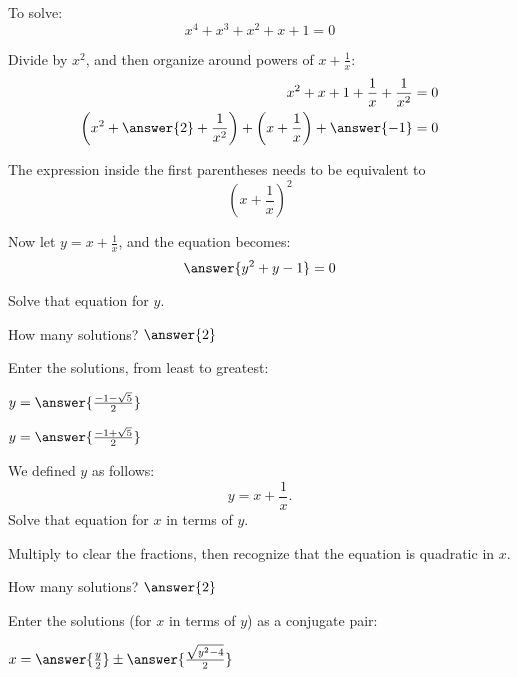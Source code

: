 \documentclass[space,nooutcomes]{ximera}
\begin{document}
\begin{problem}

To solve: 
\[
x^4+x^3+x^2+x+1=0
\]

Divide by $x^2$, and then organize around powers of $x + \frac{1}{x}$: 
\begin{align*}
x^2+x+1+\frac{1}{x}+\frac{1}{x^2}&=0 \\
\left(x^2+ \answer{2} + \frac{1}{x^2}\right)+ \left(x+\frac{1}{x}\right)+\answer{-1}&=0 \\
\end{align*}
\begin{hint}
The expression inside the first parentheses needs to be equivalent to 
\[
\left(x+\frac{1}{x}\right)^2
\]
\end{hint}
\begin{problem}
Now let $y = x + \frac{1}{x}$, and the equation becomes: 
\[
\answer{y^2+y-1}=0
\]

Solve that equation for $y$.

How many solutions?  $\answer{2}$ 

\begin{problem}
Enter the solutions, from least to greatest: 

\begin{prompt}
$y = \answer{\frac{-1-\sqrt{5}}{2}}$

$y = \answer{\frac{-1+\sqrt{5}}{2}}$
\end{prompt}

\end{problem}
\end{problem}
\end{problem}

\begin{problem}
We defined $y$ as follows: 
\[
y = x + \frac{1}{x}.  
\]
Solve that equation for $x$ in terms of $y$.  
\begin{hint}
Multiply to clear the fractions, then recognize that the equation is quadratic in $x$.  
\end{hint}

How many solutions?  $\answer{2}$ 
\begin{problem}
\begin{prompt}
Enter the solutions (for $x$ in terms of $y$) as a conjugate pair: 

$x = \answer{\frac{y}{2}} \pm \answer{\frac{\sqrt{y^2-4}}{2}}$

\end{prompt}

\end{problem}
\end{problem}
\end{document}
